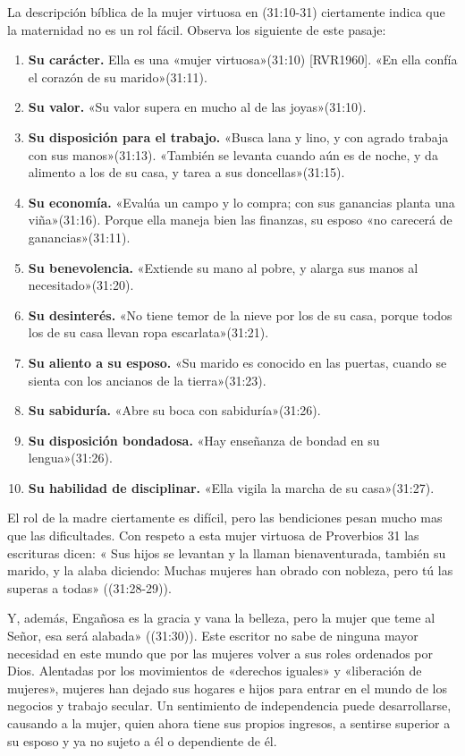 \documentclass[12pt, twoside, openright]{book}
\begin{document}
La descripción bíblica de la mujer virtuosa en (31:10-31) ciertamente indica que la maternidad no es un rol fácil. Observa los siguiente de este pasaje:
\begin{enumerate}
\item\textbf{Su carácter.} Ella es una «mujer virtuosa»(31:10) [RVR1960]. «En ella confía el corazón de su marido»(31:11).
\item\textbf{Su valor.} «Su valor supera en mucho al de las joyas»(31:10).
\item\textbf{Su disposición para el trabajo.} «Busca lana y lino, y con agrado trabaja con sus manos»(31:13). «También se levanta cuando aún es de noche, y da alimento a los de su casa, y tarea a sus doncellas»(31:15).
\item\textbf{Su economía.} «Evalúa un campo y lo compra; con sus ganancias planta una viña»(31:16). Porque ella maneja bien las finanzas, su esposo «no carecerá de ganancias»(31:11).
\item\textbf{Su benevolencia.} «Extiende su mano al pobre, y alarga sus manos al necesitado»(31:20).
\item\textbf{Su desinterés.} «No tiene temor de la nieve por los de su casa, porque todos los de su casa llevan ropa escarlata»(31:21).
\item\textbf{Su aliento a su esposo.} «Su marido es conocido en las puertas, cuando se sienta con los ancianos de la tierra»(31:23).
\item\textbf{Su sabiduría.} «Abre su boca con sabiduría»(31:26).
\item\textbf{Su disposición bondadosa.} «Hay enseñanza de bondad en su lengua»(31:26). 
\item\textbf{Su habilidad de disciplinar.} «Ella vigila la marcha de su casa»(31:27).
\end{enumerate}
El rol de la madre ciertamente es difícil, pero las bendiciones pesan mucho mas que las dificultades. Con respeto a esta mujer virtuosa de Proverbios 31 las escrituras dicen: « Sus hijos se levantan y la llaman bienaventurada, también su marido, y la alaba diciendo: Muchas mujeres han obrado con nobleza, pero tú las superas a todas» ((31:28-29)).

Y, además, Engañosa es la gracia y vana la belleza, pero la mujer que teme al Señor, esa será alabada» ((31:30)). Este escritor no sabe de ninguna mayor necesidad en este mundo que por las mujeres volver a sus roles ordenados por Dios. Alentadas por los movimientos de «derechos iguales» y «liberación de mujeres», mujeres han dejado sus hogares e hijos para entrar en el mundo de los negocios y trabajo secular. Un sentimiento de independencia puede desarrollarse, causando a la mujer, quien ahora tiene sus propios ingresos, a sentirse superior a su esposo y ya no sujeto a él o dependiente de él.
\end{document}
